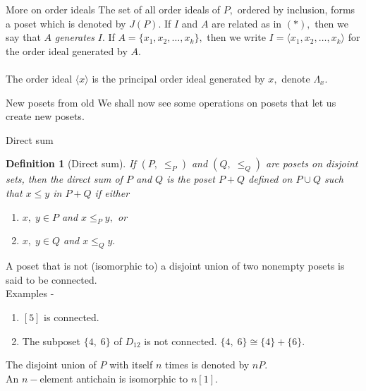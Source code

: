 \documentclass[handout, aspectratio=169]{beamer}
\newtheorem{defn}{Definition}
\begin{document}
\begin{frame}{More on order ideals}
	The set of all order ideals of $P,$ ordered by inclusion, forms a poset which is denoted by $J(P).$ If $I$ and $A$ are related as in $(*),$ then we say that $A$ \emph{generates} $I.$ If $A = \{x_1, x_2, \ldots, x_k\},$ then we write $I = \langle x_1, x_2, \ldots, x_k\rangle$ for the order ideal generated by $A.$\\~\\
	The order ideal $\langle x\rangle$ is the principal order ideal generated by $x,$ denote $\Lambda_x.$
\end{frame}
\begin{frame}{New posets from old}
	We shall now see some operations on posets that let us create new posets.
\end{frame}
\begin{frame}{Direct sum}
	\begin{defn}[Direct sum]
		If $(P,\; \le_P)$ and $(Q,\;\le_Q)$ are posets on disjoint sets, then the direct sum of $P$ and $Q$ is the poset $P + Q$ defined on $P\cup Q$ such that $x \le y$ in $P+Q$ if either
		\begin{enumerate} 
			\item $x,\;y\in P$ and $x \le_P y,$ or
			\item $x,\;y\in Q$ and $x \le_Q y.$
		\end{enumerate}
	\end{defn}
	A poset that is not (isomorphic to) a disjoint union of two nonempty posets is said to be connected.\\
	Examples - 
	\begin{enumerate} 
		\item $[5]$ is connected.
		\item The subposet $\{4,\;6\}$ of $D_{12}$ is not connected. $\{4,\;6\} \cong \{4\} + \{6\}.$
	\end{enumerate}
	The disjoint union of $P$ with itself $n$ times is denoted by $nP.$\\
	An $n-$element antichain is isomorphic to $n[1].$
\end{frame}
\end{document}

